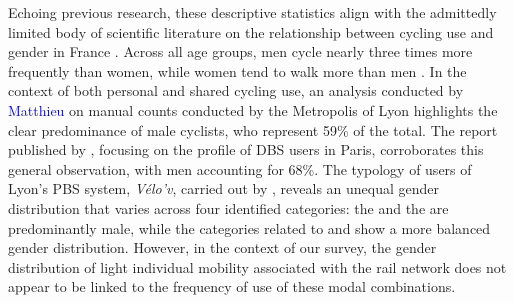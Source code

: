 \begin{refsegment}
Echoing previous research, these descriptive statistics align with the admittedly limited body of scientific literature on the relationship between cycling use and gender in France \textcolor{blue}{\autocite[1]{gaudron-arlon_gender_2022}}. Across all age groups, men cycle nearly three times more frequently than women, while women tend to walk more than men \textcolor{blue}{\autocite[2]{rossignol_femmes_2023}}. In the context of both personal and shared cycling use, an analysis conducted by \textcolor{blue}{Matthieu} \textcolor{blue}{\textcite{adam_quart_2018}} on manual counts conducted by the Metropolis of Lyon highlights the clear predominance of male cyclists, who represent 59\% of the total. The report published by \textcolor{blue}{\textcite[27]{6t-bureau_de_recherche_etude_2018}}, focusing on the profile of \acrshort{DBS} users in Paris, corroborates this general observation, with men accounting for 68\%. The typology of users of Lyon's \acrshort{PBS} system, \textsl{Vélo'v}, carried out by \textcolor{blue}{\textcite[289]{vogel_bicycle_2014}}, reveals an unequal gender distribution that varies across four identified categories: the  and the  are predominantly male, while the categories related to  and  show a more balanced gender distribution. However, in the context of our survey, the gender distribution of light individual mobility associated with the rail network does not appear to be linked to the frequency of use of these modal combinations. %


\end{refsegment}
